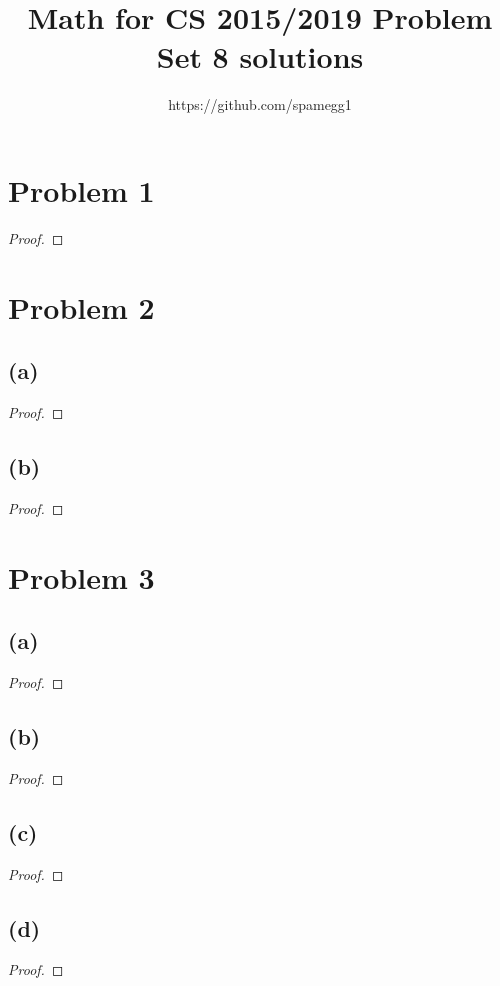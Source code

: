 \documentclass[14pt]{extarticle}
\title{Math for CS 2015/2019 Problem Set 8 solutions}
\author{https://github.com/spamegg1}
\begin{document}
\maketitle
\tableofcontents

\section{Problem 1}

\begin{proof}

\end{proof}

\section{Problem 2}
\subsection{(a)}

\begin{proof}
\end{proof}

\subsection{(b)}
\begin{proof}
\end{proof}

\section{Problem 3}

\subsection{(a)}
\begin{proof}
\end{proof}

\subsection{(b)}
\begin{proof}
\end{proof}

\subsection{(c)}
\begin{proof}
\end{proof}

\subsection{(d)}
\begin{proof}
\end{proof}
\end{document}
